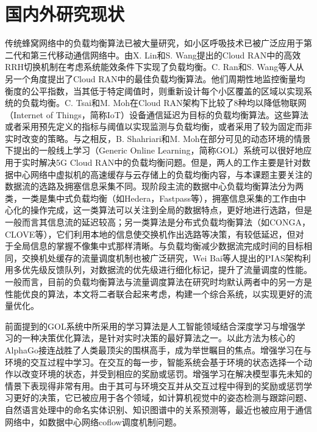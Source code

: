 \section{国内外研究现状}
传统蜂窝网络中的负载均衡算法已被大量研究，如小区呼吸技术\cite{niu2010cell}已被广泛应用于第二代和第三代移动通信网络中。由X. Lin和S. Wang提出的Cloud RAN中的高效RRH切换机制在考虑系统能效条件下实现了负载均衡\cite{lin2010efficient}。C. Ran和S. Wang等人\cite{ran2015optimal}从另一个角度提出了Cloud RAN中的最佳负载均衡算法。他们周期性地监控衡量均衡度的公平指数，当其低于特定阈值时，则重新设计每个小区覆盖的区域以实现系统的负载均衡。C. Tsai和M. Moh在Cloud RAN架构下比较了8种均以降低物联网（Internet of Things，简称IoT）设备通信延迟为目标的负载均衡算法。这些算法或者采用预先定义的指标与阈值以实现监测与负载均衡，或者采用了较为固定而非实时改变的策略。与之相反，B. Shahriari和M. Moh在部分可见的动态环境的情景下提出的一般线上学习（Generic Online Learning，简称GOL）系统可以很好地应用于实时解决5G Cloud RAN中的负载均衡问题。但是，两人的工作主要是针对数据中心网络中虚拟机的高速缓存与云存储上的负载均衡内容，与本课题主要关注的数据流的选路及拥塞信息采集不同。现阶段主流的数据中心负载均衡算法分为两类，一类是集中式负载均衡（如Hedera，Fastpass等），拥塞信息采集的工作由中心化的操作完成，这一类算法可以关注到全局的数据特点，更好地进行选路，但是一般而言其信息流的延迟较高；另一类算法是分布式负载均衡算法（如CONGA，CLOVE等），它们利用本地的信息使交换机作出选路等决策，有较低延迟，但对于全局信息的掌握不像集中式那样清晰。与负载均衡减少数据流完成时间的目标相同，交换机处缓存的流量调度机制也被广泛研究，Wei Bai等人提出的PIAS架构利用多优先级反馈队列，对数据流的优先级进行细化标记，提升了流量调度的性能。一般而言，目前的负载均衡算法与流量调度算法在研究时均默认两者中的另一方是性能优良的算法，本文将二者联合起来考虑，构建一个综合系统，以实现更好的流量优化。

前面提到的GOL系统中所采用的学习算法是人工智能领域结合深度学习与增强学习的一种决策优化算法，是针对实时决策的最好算法之一。以此方法为核心的AlphaGo\cite{alphago}接连战胜了人类最顶尖的围棋高手，成为举世瞩目的焦点。增强学习在与环境的交互过程中学习。在交互的每一步，智能系统会基于环境的状态选择一个动作以改变环境的状态，并受到相应的奖励或惩罚。增强学习在解决模型事先未知的情景下表现得非常有用。由于其可与环境交互并从交互过程中得到的奖励或惩罚学习更好的决策，它已被应用于各个领域，如计算机视觉中的姿态检测与跟踪问题、自然语言处理中的命名实体识别、知识图谱中的关系预测等，最近也被应用于通信网络中，如数据中心网络coflow调度机制问题。


